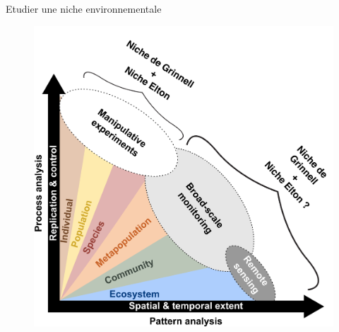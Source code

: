 \documentclass[%
]{beamer}
\begin{document}
	\begin{frame}{Etudier une niche environnementale}
	\begin{figure}[t]
		\begin{center}
			\includegraphics[scale = 0.07]{figs/Fig_scale_monitoring_3.png}
		\end{center}
	\end{figure}
	\end{frame}
	
\end{document}
